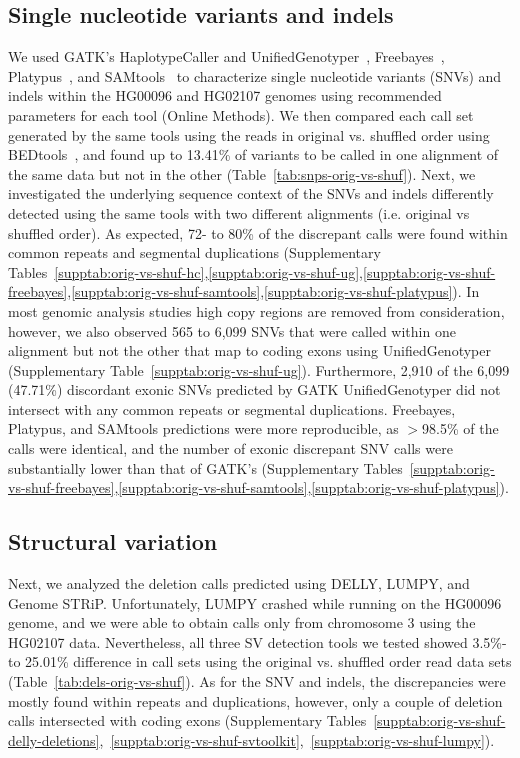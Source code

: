 \documentclass[10pt,a4paper]{article}
\begin{document}
\subsection*{Single nucleotide variants and indels}
We used GATK's HaplotypeCaller and UnifiedGenotyper~\cite{DePristo2011}, Freebayes~\cite{Garrison2012}, Platypus~\cite{Rimmer2014}, and SAMtools~\cite{Li2009b} to characterize
single nucleotide variants (SNVs) and indels within the HG00096 and HG02107 genomes using recommended parameters for each tool (Online Methods). We then compared each call set generated by the same tools using the reads in original vs. shuffled order using BEDtools~\cite{Quinlan2010a}, and found up to 13.41\% of variants to be called in one alignment of the same data but not in the other (Table~\ref{tab:snps-orig-vs-shuf}).
Next, we investigated the underlying sequence context of the SNVs 
and indels differently detected using the same tools with two different alignments (i.e. original vs shuffled order). 
As expected, 72- to 80\% of the discrepant calls were found within common repeats and segmental duplications (Supplementary Tables~\ref{supptab:orig-vs-shuf-hc},\ref{supptab:orig-vs-shuf-ug},\ref{supptab:orig-vs-shuf-freebayes},\ref{supptab:orig-vs-shuf-samtools},\ref{supptab:orig-vs-shuf-platypus}). 
In most genomic analysis studies high copy regions are removed from consideration, however, we also observed 565 to 6,099 
SNVs that were called within one alignment but not the other that map to coding exons using UnifiedGenotyper (Supplementary Table~\ref{supptab:orig-vs-shuf-ug}). 
Furthermore, 2,910 of the 6,099 (47.71\%) discordant exonic SNVs predicted by GATK UnifiedGenotyper did not intersect with any common repeats or segmental duplications.
Freebayes, Platypus, and SAMtools predictions were more reproducible, as $>$98.5\% of the calls were identical, and the number of exonic discrepant SNV calls were substantially lower than
that of GATK's (Supplementary Tables~\ref{supptab:orig-vs-shuf-freebayes},\ref{supptab:orig-vs-shuf-samtools},\ref{supptab:orig-vs-shuf-platypus}). 

\subsection*{Structural variation}
Next, we analyzed the deletion calls predicted using DELLY, LUMPY, and Genome STRiP. Unfortunately, LUMPY crashed while running on the HG00096 genome, and we were able to obtain calls only from chromosome 3 using the HG02107 data. Nevertheless, all three SV detection tools we tested showed 3.5\%- to 25.01\% difference in call sets using the original vs. shuffled order read data sets (Table~\ref{tab:dels-orig-vs-shuf}). As for the SNV and indels, the discrepancies were mostly found within repeats and duplications, however, only a couple of deletion calls intersected with coding exons (Supplementary Tables~\ref{supptab:orig-vs-shuf-delly-deletions},~\ref{supptab:orig-vs-shuf-svtoolkit},~\ref{supptab:orig-vs-shuf-lumpy}). 
\end{document}
